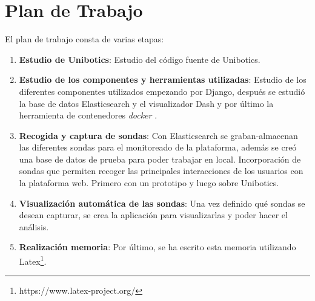 \section{Plan de Trabajo}
El plan de trabajo consta de varias etapas:

\begin{enumerate}
\item \textbf{Estudio de Unibotics}: Estudio del código fuente de Unibotics.
\item \textbf{Estudio de los componentes y herramientas utilizadas}: Estudio de los diferentes componentes utilizados empezando por Django, después se estudió la base de datos Elasticsearch y el visualizador Dash y por último la herramienta de contenedores \textit{docker} .
\item \textbf{Recogida y captura de sondas}: Con Elasticsearch se graban-almacenan las diferentes sondas para el monitoreado de la plataforma, además se creó una base de datos de prueba para poder trabajar en local. Incorporación de sondas que permiten recoger las principales interacciones de los usuarios con la plataforma web. Primero con un prototipo y luego sobre Unibotics.
\item \textbf{Visualización automática de las sondas}: Una vez definido qué sondas se desean capturar, se crea la aplicación para visualizarlas y poder hacer el análisis.
\item \textbf{Realización memoria}: Por último, se ha escrito esta memoria utilizando Latex\footnote{https://www.latex-project.org/}.
\end{enumerate}








